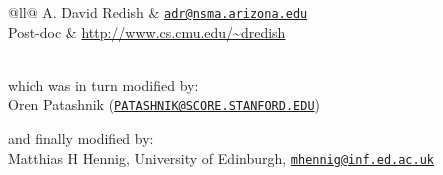 \documentclass[DIV=8, parskip=half, pagesize=auto]{scrartcl}
\newcommand*{\mail}[1]{\href{mailto:#1}{\texttt{#1}}}
\begin{document}
\begin{tabular}{@{}ll@{}}
  \toprule
  A. David Redish & \mail{adr@nsma.arizona.edu}                               \\
  Post-doc        & \url{http://www.cs.cmu.edu/~dredish}                      \\
   \\
  \bottomrule
\end{tabular}

which was in turn modified by:\\
Oren Patashnik (\mail{PATASHNIK@SCORE.STANFORD.EDU})

and finally modified by:\\
Matthias H Hennig, University of Edinburgh, \mail{mhennig@inf.ed.ac.uk}
\end{document}
